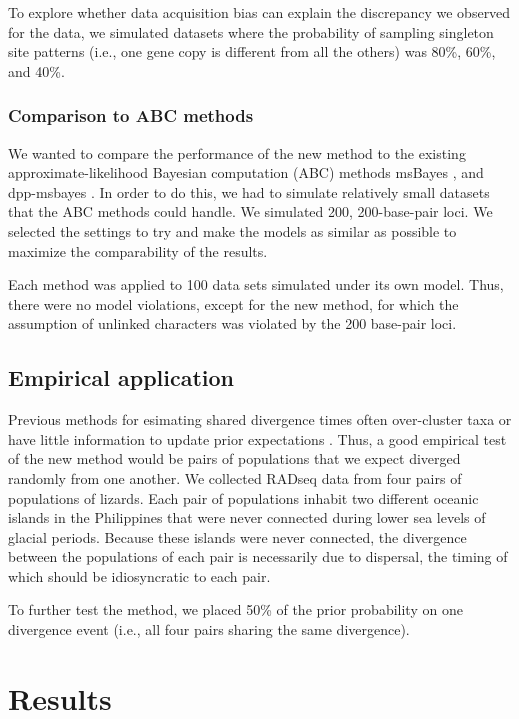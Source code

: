 To explore whether data acquisition bias can explain the discrepancy we
observed for the  data, we simulated datasets where the
probability of sampling singleton site patterns (i.e., one gene copy is different from all the others)
was 80\%, 60\%, and 40\%.


\subsubsection{Comparison to ABC methods}
We wanted to compare the performance of the new method to the existing
approximate-likelihood Bayesian computation (ABC) methods msBayes
\citep{Huang2011}, and dpp-msbayes \citep{Oaks2014dpp}.
In order to do this, we had to simulate relatively small datasets
that the ABC methods could handle.
We simulated 200, 200-base-pair loci.
We selected the settings to try and make the models as similar
as possible to maximize the comparability of the results.

Each method was applied to 100 data sets simulated under its own model.
Thus, there were no model violations, except for the new method, for which the
assumption of unlinked characters was violated by the 200 base-pair loci.

\subsection{Empirical application}
Previous methods for esimating shared divergence times often over-cluster taxa
\citep{Oaks2012,Oaks2014reply} or have little information to update prior
expectations \citep{Oaks2014dpp}.
Thus, a good empirical test of the new method would be pairs of populations
that we expect diverged randomly from one another.
We collected RADseq data from four pairs of populations of  lizards.
Each pair of populations inhabit two different oceanic islands in the
Philippines that were never connected during lower sea levels of glacial
periods.
Because these islands were never connected, the divergence between the
populations of each pair is necessarily due to dispersal, the timing of which
should be idiosyncratic to each pair.

To further test the method, we placed 50\% of the prior probability on one
divergence event (i.e., all four pairs sharing the same divergence).


\section{Results}

